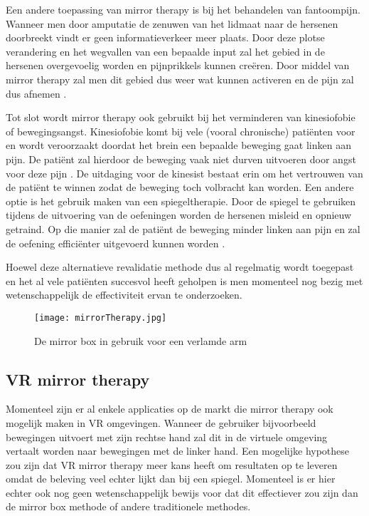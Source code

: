 Een andere toepassing van mirror therapy is bij het behandelen van fantoompijn. Wanneer men door amputatie de zenuwen van het lidmaat naar de hersenen doorbreekt vindt er geen informatieverkeer meer plaats. Door deze plotse verandering en het wegvallen van een bepaalde input zal het gebied in de hersenen overgevoelig worden en pijnprikkels kunnen creëren. Door middel van mirror therapy zal men dit gebied dus weer wat kunnen activeren en de pijn zal dus afnemen \autocite{Veenstra2019}.

Tot slot wordt mirror therapy ook gebruikt bij het verminderen van kinesiofobie of bewegingsangst. Kinesiofobie komt bij vele (vooral chronische) patiënten voor en wordt veroorzaakt doordat het brein een bepaalde beweging gaat linken aan pijn. De patiënt zal hierdoor de beweging vaak niet durven uitvoeren door angst voor deze pijn \autocite{KOCHOA2019}. De uitdaging voor de kinesist bestaat erin om het vertrouwen van de patiënt te winnen zodat de beweging toch volbracht kan worden. Een andere optie is het gebruik maken van een spiegeltherapie. Door de spiegel te gebruiken tijdens de uitvoering van de oefeningen worden de hersenen misleid en opnieuw getraind. Op die manier zal de patiënt de beweging minder linken aan pijn en zal de oefening efficiënter uitgevoerd kunnen worden \autocite{Burken2019}.

Hoewel deze alternatieve revalidatie methode dus al regelmatig wordt toegepast en het al vele patiënten succesvol heeft geholpen is men momenteel nog bezig met wetenschappelijk de effectiviteit ervan te onderzoeken.

\begin{figure}[h]
    \centering
    \texttt{[image: mirrorTherapy.jpg]}
    \caption{De mirror box in gebruik voor een verlamde arm \autocite{Saebo2018}}
\end{figure}

\subsection{VR mirror therapy}
Momenteel zijn er al enkele applicaties op de markt die mirror therapy ook mogelijk maken in VR omgevingen. Wanneer de gebruiker bijvoorbeeld bewegingen uitvoert met zijn rechtse hand zal dit in de virtuele omgeving vertaalt worden naar bewegingen met de linker hand. Een mogelijke hypothese zou zijn dat VR mirror therapy meer kans heeft om resultaten op te leveren omdat de beleving veel echter lijkt dan bij een spiegel. Momenteel is er hier echter ook nog geen wetenschappelijk bewijs voor dat dit effectiever zou zijn dan de mirror box methode of andere traditionele methodes. 

